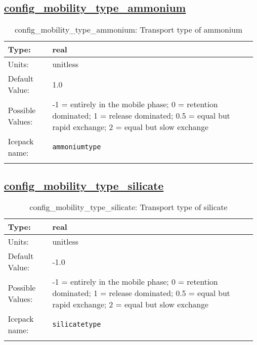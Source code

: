 \subsection[config\_mobility\_type\_ammonium]{\hyperref[sec:nm_tab_biogeochemistry]{config\_mobility\_type\_ammonium}}
\label{subsec:nm_sec_config_mobility_type_ammonium}
\begin{center}
\begin{longtable}{| p{2.0in} || p{4.0in} |}
    \hline
    Type: & real \\
    \hline
    Units: & \si{unitless} \\
    \hline
    Default Value: & 1.0 \\
    \hline
    Possible Values: & -1 = entirely in the mobile phase; 0 = retention dominated; 1 = release dominated; 0.5 = equal but rapid exchange; 2 = equal but slow exchange \\
    \hline
    Icepack name: & \verb+ammoniumtype+ \\
    \hline
    \caption{config\_mobility\_type\_ammonium: Transport type of ammonium}
\end{longtable}
\end{center}
\subsection[config\_mobility\_type\_silicate]{\hyperref[sec:nm_tab_biogeochemistry]{config\_mobility\_type\_silicate}}
\label{subsec:nm_sec_config_mobility_type_silicate}
\begin{center}
\begin{longtable}{| p{2.0in} || p{4.0in} |}
    \hline
    Type: & real \\
    \hline
    Units: & \si{unitless} \\
    \hline
    Default Value: & -1.0 \\
    \hline
    Possible Values: & -1 = entirely in the mobile phase; 0 = retention dominated; 1 = release dominated; 0.5 = equal but rapid exchange; 2 = equal but slow exchange \\
    \hline
    Icepack name: & \verb+silicatetype+ \\
    \hline
    \caption{config\_mobility\_type\_silicate: Transport type of silicate}
\end{longtable}
\end{center}
